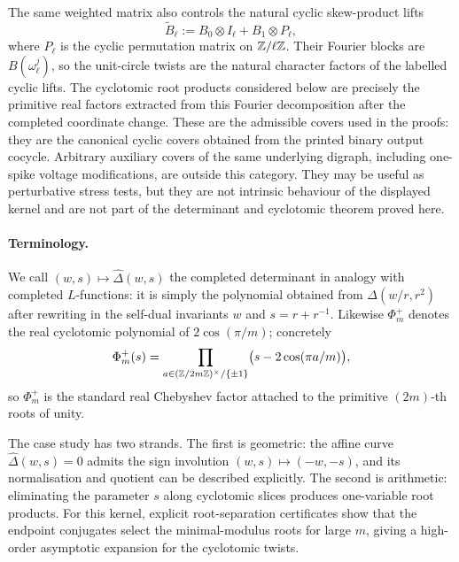 The same weighted matrix also controls the natural cyclic skew-product
lifts
\[
  \widetilde B_\ell:=B_0\otimes I_\ell+B_1\otimes P_\ell,
\]
where \(P_\ell\) is the cyclic permutation matrix on
\(\mathbb{Z}/\ell\mathbb{Z}\). Their Fourier blocks are \(B(\omega_\ell^j)\), so the unit-circle twists are the
natural character factors of the labelled cyclic lifts. The cyclotomic
root products considered below are precisely the primitive real factors
extracted from this Fourier decomposition after the completed
coordinate change.
These are the admissible covers used in the proofs: they are
the canonical cyclic covers obtained from the printed binary output
cocycle.  Arbitrary auxiliary covers of the same underlying digraph,
including one-spike voltage modifications, are outside this category.
They may be useful as perturbative stress tests, but they are not
intrinsic behaviour of the displayed kernel and are not part of the
determinant and cyclotomic theorem proved here.


\paragraph{Terminology.}
We call \((w,s)\mapsto \widehat\Delta(w,s)\) the completed determinant in analogy with completed \(L\)-functions: it is simply the polynomial obtained from \(\Delta(w/r,r^2)\) after rewriting in the self-dual invariants \(w\) and \(s=r+r^{-1}\). Likewise \(\Phi_m^+\) denotes the real cyclotomic polynomial of \(2\cos(\pi/m)\); concretely
\[
  \Phi_m^+(s)
  =\prod_{a\in(\mathbb{Z}/2m\mathbb{Z})^\times/\{\pm1\}}
    \bigl(s-2\cos(\pi a/m)\bigr),
\]
so \(\Phi_m^+\) is the standard real Chebyshev factor attached to the primitive \((2m)\)-th roots of unity.



The case study has two strands. The first is geometric: the affine curve
\(\widehat\Delta(w,s)=0\) admits the sign involution
\((w,s)\mapsto(-w,-s)\), and its normalisation and quotient can be
described explicitly. The second is arithmetic: eliminating the
parameter \(s\) along cyclotomic slices produces one-variable root
products. For this kernel, explicit
root-separation certificates show that the endpoint conjugates select
the minimal-modulus roots for large \(m\), giving a high-order
asymptotic expansion for the cyclotomic twists.

